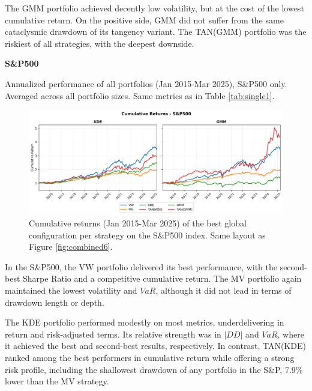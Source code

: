 The GMM portfolio achieved decently low volatility, but at the cost of the lowest cumulative return. On the positive side, GMM did not suffer from the same cataclysmic drawdown of its tangency variant. The TAN(GMM) portfolio was the riskiest of all strategies, with the deepest downside.

\newpage
\begin{center}
  \textbf{S\&P500}
\end{center}
\begin{table}[H]
  \centering
  
  \caption[Global best configuration - All strategies - S\&P500]{Annualized performance of all portfolios (Jan 2015-Mar 2025), S\&P500 only. Averaged across all portfolio sizes. Same metrics as in Table \ref{tab:single1}.}
  \label{tab:single7}
\end{table}

\begin{figure}[H]
  \begin{center}
  \begin{minipage}{1\textwidth}
    \centering
    \includegraphics[width=\textwidth]{images/40_8.png}
  \end{minipage}
  \caption[Global best configuration - S\&P500 - Cumulative returns]{Cumulative returns (Jan 2015-Mar 2025) of the best global configuration per strategy on the S\&P500 index. Same layout as Figure \ref{fig:combined6}.}
  \label{fig:combined8}
  \end{center}
  \end{figure}

In the S\&P500, the VW portfolio delivered its best performance, with the second-best Sharpe Ratio and a competitive cumulative return. The MV portfolio again maintained the lowest volatility and $VaR$, although it did not lead in terms of drawdown length or depth.

The KDE portfolio performed modestly on most metrics, underdelivering in return and risk-adjusted terms. Its relative strength was in $|DD|$ and $VaR$, where it achieved the best and second-best results, respectively. In contrast, TAN(KDE) ranked among the best performers in cumulative return while offering a strong risk profile, including the shallowest drawdown of any portfolio in the S\&P, 7.9\% lower than the MV strategy.

